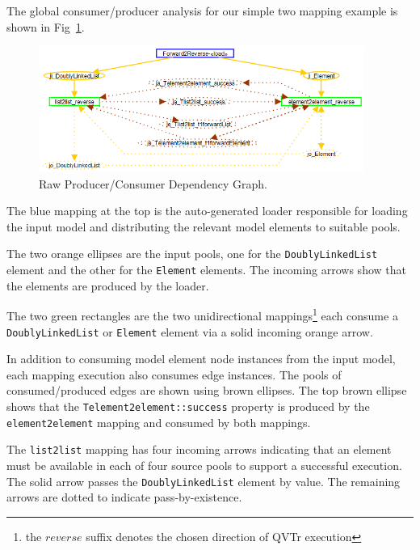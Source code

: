 \documentclass{llncs}
\begin{document}
The global consumer/producer analysis for our simple two mapping example is shown in Fig~\ref{fig:RawSchedule}.

\begin{figure}[h]
	\centering
	\includegraphics[width=0.95\textwidth]{RawSchedule.png}
	\caption{Raw Producer/Consumer Dependency Graph.}
	\label{fig:RawSchedule}
\end{figure}

The blue mapping at the top is the auto-generated loader responsible for loading the input model and distributing the relevant model elements to suitable pools.

The two orange ellipses are the input pools, one for the \verb$DoublyLinkedList$ element and the other for the \verb$Element$ elements. The incoming arrows show that the elements are produced by the loader.

The two green rectangles are the two unidirectional mappings\footnote{the $reverse$ suffix denotes the chosen direction of QVTr execution} each consume a \verb$DoublyLinkedList$ or \verb$Element$ element via a solid incoming orange arrow.

In addition to consuming model element node instances from the input model, each mapping execution also consumes edge instances. The pools of consumed/produced edges are shown using brown ellipses. The top brown ellipse shows that the \verb$Telement2element::success$ property is produced by the \verb$element2element$ mapping and consumed by both mappings.

The \verb$list2list$ mapping has four incoming arrows indicating that an element must be available in each of four source pools to support a successful execution. The solid arrow passes the \verb$DoublyLinkedList$ element by value. The remaining arrows are dotted to indicate pass-by-existence. 


\end{document}
